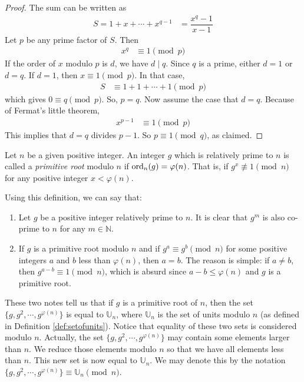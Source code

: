 \begin{proof}
	The sum can be written as
		\begin{align*}
			S = 1+x+\cdots+x^{q-1} & = \dfrac{x^q-1}{x-1}
		\end{align*}
	Let $p$ be any prime factor of $S$. Then
		\begin{align*}
			x^q & \equiv1\pmod p
		\end{align*}
	If the order of $x$ modulo $p$ is $d$, we have $d\mid q$. Since $q$ is a prime, either $d=1$ or $d=q$. If $d=1$, then $x\equiv1\pmod p$. In that case,
		\begin{align*}
			S & \equiv 1+1+\cdots+1\pmod p
		\end{align*}
	which gives $0  \equiv q\pmod p$. So, $p=q$. Now assume the case that $d=q$. Because of Fermat's little theorem,
		\begin{align*}
			x^{p-1} & \equiv1\pmod p
		\end{align*}
	This implies that $d=q$ divides $p-1$. So $p\equiv1\pmod q$, as claimed.
\end{proof}

\begin{definition}
	Let $n$ be a given positive integer. An integer $g$ which is relatively prime to $n$  is called a \textit{primitive root} modulo $n$ if $\operatorname{ord}_n(g)=\varphi(n)$. That is, if $g^x\not\equiv1\pmod n$ for any positive integer $x<\varphi(n)$.
\end{definition}

\begin{note}
	Using this definition, we can say that:
		\begin{enumerate}
			\item Let $g$ be a positive integer relatively prime to $n$. It is clear that $g^m$ is also co-prime to $n$ for any $m \in \mathbb N$.
			\item If $g$ is a primitive root modulo $n$ and if $g^a \equiv g^b \pmod n$ for some positive integers $a$ and $b$ less than $\varphi(n)$, then $a=b$. The reason is simple: if $a \neq b$, then $g^{a-b} \equiv 1 \pmod n$, which is absurd since $a-b \leq \varphi(n)$ and $g$ is a primitive root.
		\end{enumerate}
\end{note}

These two notes tell us that if $g$ is a primitive root of $n$, then the set $\{g,g^2,\cdots,g^{\varphi(n)}\}$ is equal to $\mathbb U_n$, where $\mathbb U_n$ is the set of units modulo $n$ (as defined in Definition \ref{def:setofunits}). Notice that equality of these two sets is considered modulo $n$. Actually, the set $\{g,g^2,\cdots,g^{\varphi(n)}\}$ may contain some elements larger than $n$. We reduce those elements modulo $n$ so that we have all elements less than $n$. This new set is now equal to $\mathbb U_n$. We may denote this by the notation $\{g,g^2,\cdots,g^{\varphi(n)}\} \equiv \mathbb U_n \pmod n$.

